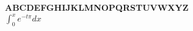 \documentclass{article}
\begin{document}
\vfill\hbox{}
\begin{center}
  \large
  \textbf{ABCDEFGHIJKLMNOPQRSTUVWXYZ}\\
  $\int_0^x e^{-t\pi} dx$\\
\end{center}
\vfill\hbox{}
\end{document}
